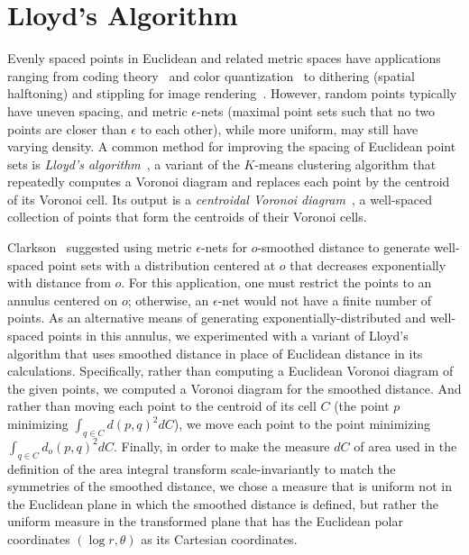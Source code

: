 \documentclass[10pt, conference, compsocconf]{IEEEtran}
\begin{document}
\section{Lloyd's Algorithm}
\label{sec:lloyd}

Evenly spaced points in Euclidean and related metric spaces have applications ranging from coding theory~\cite{Llo-ITIT-82} and color quantization~\cite{Hec-SIGGRAPH-82} to dithering (spatial halftoning) and stippling for image rendering~\cite{MacIseAnd-CG-08,Uli-87}. However, random points  typically have uneven spacing, and metric $\epsilon$-nets (maximal point sets such that no two points are closer than $\epsilon$ to each other), while more uniform, may still have varying density. A common method for improving the spacing of Euclidean point sets is \emph{Lloyd's algorithm}~\cite{Llo-ITIT-82}, a variant of the $K$-means clustering algorithm that repeatedly computes a Voronoi diagram and replaces each point by the centroid of its Voronoi cell. Its output is a \emph{centroidal Voronoi diagram}~\cite{DuFabGun-SR-99}, a well-spaced collection of points that form the centroids of their Voronoi cells.

Clarkson~\cite{Cla-UCI-08} suggested using metric $\epsilon$-nets for $o$-smoothed distance to generate well-spaced point sets with a distribution centered at $o$ that decreases exponentially with distance from $o$. For this application, one must restrict the points to an annulus centered on $o$; otherwise, an $\epsilon$-net would not have a finite number of points. As an alternative means of generating exponentially-distributed and well-spaced points in this annulus, we experimented with a variant of Lloyd's algorithm that uses smoothed distance in place of Euclidean distance in its calculations.
Specifically, rather than computing a Euclidean Voronoi diagram of the given points, we computed a Voronoi diagram for the smoothed distance. And rather than moving each point to the centroid of its cell $C$ (the point $p$ minimizing $\int_{q\in C} d(p,q)^2 dC$), we move each point to the point minimizing $\int_{q\in C} d_o(p,q)^2 dC$. Finally, in order to make the measure $dC$ of area used in the definition of the area integral transform scale-invariantly to match the symmetries of the smoothed distance, we chose a measure that is uniform not in the Euclidean plane in which the smoothed distance is defined, but rather the uniform measure in the transformed plane that has the Euclidean polar coordinates $(\log r,\theta)$ as its Cartesian coordinates.
\end{document}
